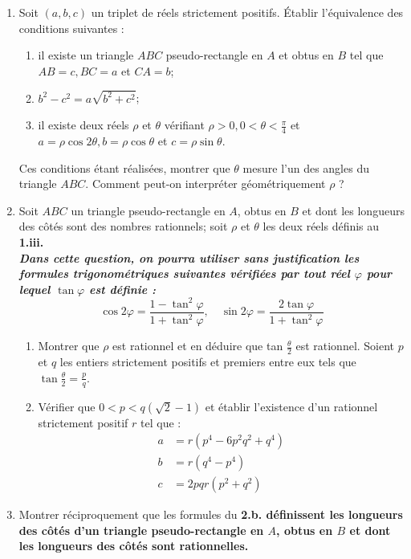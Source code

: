 \documentclass[landscape,twocolumn,leqno,a4paper,10pt]{report} %
\renewcommand{\textbf}[1]{\begingroup\bfseries\mathversion{bold}#1\endgroup}		%
\begin{document}
\begin{enumerate}
	\item Soit $(a, b, c)$ un triplet de réels strictement positifs. Établir l'équivalence des conditions suivantes :
	\begin{enumerate}
		\item[i.] il existe un triangle $A B C$ pseudo-rectangle en $A$ et obtus en $B$ tel que $A B=c, B C=a$ et $C A=b$;
		\item[ii.] $b^{2}-c^{2}=a \sqrt{b^{2}+c^{2}}$;
		\item[iii.] il existe deux réels $\rho$ et $\theta$ vérifiant $\rho>0,0<\theta<\frac{\pi}{4}$ et $a=\rho \cos 2 \theta, b=\rho \cos \theta$ et $c=\rho \sin \theta$.
	\end{enumerate}
	Ces conditions étant réalisées, montrer que $\theta$ mesure l'un des angles du triangle $A B C$. Comment peut-on interpréter géométriquement $\rho$ ?
	\item Soit $A B C$ un triangle pseudo-rectangle en $A$, obtus en $B$ et dont les longueurs des côtés sont des nombres rationnels; soit $\rho$ et $\theta$ les deux réels définis au \textbf{1.iii.}\\
	\textit{Dans cette question, on pourra utiliser sans justification les formules trigonométriques suivantes vérifiées par tout réel $\varphi$ pour lequel $\tan \varphi$ est définie :}
	$$\cos 2 \varphi=\frac{1-\tan ^{2} \varphi}{1+\tan ^{2} \varphi}, \quad \sin 2 \varphi=\frac{2 \tan \varphi}{1+\tan ^{2} \varphi}$$
	\begin{enumerate}
		\item Montrer que $\rho$ est rationnel et en déduire que tan $\frac{\theta}{2}$ est rationnel. Soient $p$ et $q$ les entiers strictement positifs et premiers entre eux tels que $\tan \frac{\theta}{2}=\frac{p}{q}$.
		\item Vérifier que $0<p<q(\sqrt{2}-1)$ et établir l'existence d'un rationnel strictement positif $r$ tel que :
		\begin{align*}
		a &=r\left(p^{4}-6 p^{2} q^{2}+q^{4}\right) \\
		b &=r\left(q^{4}-p^{4}\right) \\
		c &=2 p q r\left(p^{2}+q^{2}\right)
		\end{align*}
	\end{enumerate}
	\item Montrer réciproquement que les formules du \textbf{2.b.} définissent les longueurs des côtés d'un triangle pseudo-rectangle en $A$, obtus en $B$ et dont les longueurs des côtés sont rationnelles.

\end{enumerate}
\end{document}
